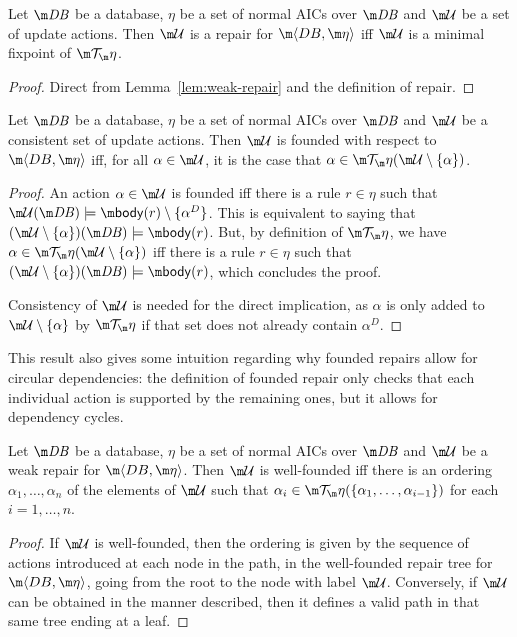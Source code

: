 \begin{lemma}
  \label{lem:repair}
  Let $\db$ be a database, $\eta$ be a set of normal AICs over $\db$ and $\UU$ be a set of update actions.
  Then $\UU$ is a repair for $\fulldb$ iff $\UU$ is a minimal fixpoint of $\Op$.
\end{lemma}
\begin{proof}
  Direct from Lemma~\ref{lem:weak-repair} and the definition of repair.
\end{proof}

\begin{lemma}
  \label{lem:founded-char}
  Let $\db$ be a database, $\eta$ be a set of normal AICs over $\db$ and $\UU$ be a consistent set of update actions.
  Then $\UU$ is founded with respect to $\fulldb$ iff, for all $\alpha\in\UU$, it is the case that $\alpha\in\Op(\UU\setminus\{\alpha\})$.
\end{lemma}
\begin{proof}
  An action $\alpha\in\UU$ is founded iff there is a rule $r\in\eta$ such that $\UU(\db)\models\body(r)\setminus\{\alpha^D\}$.
  This is equivalent to saying that $(\UU\setminus\{\alpha\})(\db)\models\body(r)$.
  But, by definition of $\Op$, we have $\alpha\in\Op(\UU\setminus\{\alpha\})$ iff there is a rule $r\in\eta$ such that $(\UU\setminus\{\alpha\})(\db)\models\body(r)$, which concludes the proof.

  Consistency of $\UU$ is needed for the direct implication, as $\alpha$ is only added to $\UU\setminus\{\alpha\}$ by $\Op$ if that set does not already contain $\alpha^D$.
\end{proof} 

This result also gives some intuition regarding why founded repairs allow for circular dependencies: the definition of founded repair only checks that each individual action is supported by the remaining ones, but it allows for dependency cycles.

\begin{lemma}
  \label{lem:wf}
  Let $\db$ be a database, $\eta$ be a set of normal AICs over $\db$ and $\UU$ be a weak repair for $\fulldb$.
  Then $\UU$ is well-founded iff there is an ordering $\alpha_1,\ldots,\alpha_n$ of the elements of $\UU$ such that $\alpha_i\in\Op(\{\alpha_1,\ldots,\alpha_{i-1}\})$ for each $i=1,\ldots,n$.
\end{lemma}
\begin{proof}
  If $\UU$ is well-founded, then the ordering is given by the sequence of actions introduced at each node in the path, in the well-founded repair tree for $\fulldb$, going from the root to the node with label $\UU$.
  Conversely, if $\UU$ can be obtained in the manner described, then it defines a valid path in that same tree ending at a leaf.
\end{proof}

